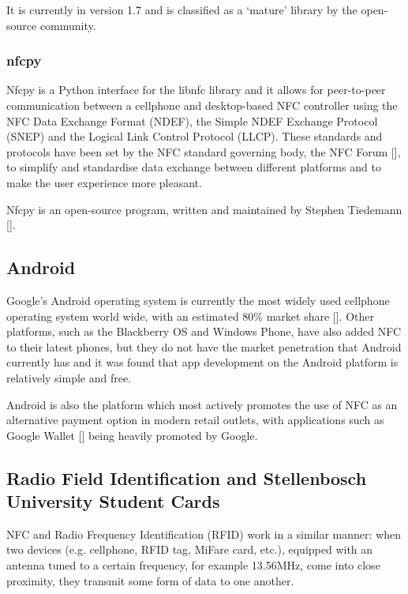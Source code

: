It is currently in version 1.7 and is classified as a `mature' library by the
open-source community.

\subsubsection{nfcpy}
\label{sec:nfcpy}

Nfcpy is a Python interface for the libnfc library and it allows for peer-to-peer communication
between a cellphone and desktop-based NFC controller using the NFC Data Exchange Format
(NDEF), the Simple NDEF Exchange Protocol (SNEP) and the Logical Link Control Protocol (LLCP).
These standards and protocols have been set by the NFC standard governing body, the NFC Forum
[\cite{website:nfc-forum}], to simplify and standardise data exchange between different
platforms and to make the user experience more pleasant.

Nfcpy is an open-source program, written and maintained by Stephen Tiedemann
[\cite{website:nfcpy}].

\subsection{Android}

Google's Android operating system is currently the most widely used cellphone operating
system world wide, with an estimated 80\% market share
[\cite{article:android-marketshare}].
Other platforms, such as the Blackberry OS and Windows Phone, have also added NFC to their
latest phones, but they do not have the market penetration that Android currently has and it
was found that app development on the Android platform is relatively simple and free.

Android is also the platform which most actively promotes the use of NFC as an
alternative payment option in modern retail outlets, with applications such as Google Wallet
[\cite{article:android-wallet}] being heavily promoted by Google.

\subsection{Radio Field Identification and Stellenbosch
University Student Cards}

NFC and Radio Frequency Identification (RFID) work in a similar manner: when two
devices  (e.g. cellphone, RFID tag, MiFare card, etc.), equipped with an antenna
tuned to a certain frequency, for example 13.56MHz, come into close
proximity, they transmit some form of data to one another.

